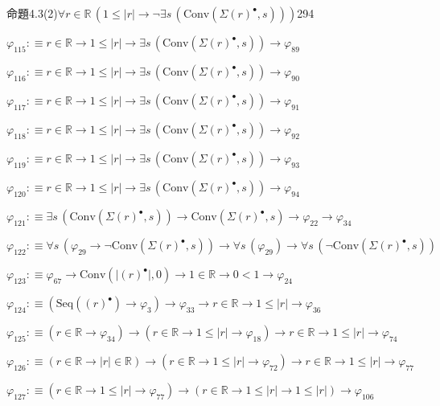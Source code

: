 \begin{fullproof}{命題4.3(2)}{$\forall r \in \mathbb{R}\,(1 \leq \lvert r \rvert \to \neg \exists s\,(\mathrm{Conv}(\Sigma {(r)^{\bullet}},s)))$}{294}
\begin{abbrevlist}
\item $\varphi_{115} :\equiv r \in \mathbb{R} \to 1 \leq \lvert r \rvert \to \exists s\,(\mathrm{Conv}(\Sigma {(r)^{\bullet}},s)) \to \varphi_{89}$
\item $\varphi_{116} :\equiv r \in \mathbb{R} \to 1 \leq \lvert r \rvert \to \exists s\,(\mathrm{Conv}(\Sigma {(r)^{\bullet}},s)) \to \varphi_{90}$
\item $\varphi_{117} :\equiv r \in \mathbb{R} \to 1 \leq \lvert r \rvert \to \exists s\,(\mathrm{Conv}(\Sigma {(r)^{\bullet}},s)) \to \varphi_{91}$
\item $\varphi_{118} :\equiv r \in \mathbb{R} \to 1 \leq \lvert r \rvert \to \exists s\,(\mathrm{Conv}(\Sigma {(r)^{\bullet}},s)) \to \varphi_{92}$
\item $\varphi_{119} :\equiv r \in \mathbb{R} \to 1 \leq \lvert r \rvert \to \exists s\,(\mathrm{Conv}(\Sigma {(r)^{\bullet}},s)) \to \varphi_{93}$
\item $\varphi_{120} :\equiv r \in \mathbb{R} \to 1 \leq \lvert r \rvert \to \exists s\,(\mathrm{Conv}(\Sigma {(r)^{\bullet}},s)) \to \varphi_{94}$
\item $\varphi_{121} :\equiv \exists s\,(\mathrm{Conv}(\Sigma {(r)^{\bullet}},s)) \to \mathrm{Conv}(\Sigma {(r)^{\bullet}},s) \to \varphi_{22} \to \varphi_{34}$
\item $\varphi_{122} :\equiv \forall s\,(\varphi_{29} \to \neg \mathrm{Conv}(\Sigma {(r)^{\bullet}},s)) \to \forall s\,(\varphi_{29}) \to \forall s\,(\neg \mathrm{Conv}(\Sigma {(r)^{\bullet}},s))$
\item $\varphi_{123} :\equiv \varphi_{67} \to \mathrm{Conv}(\lvert {(r)^{\bullet}} \rvert,0) \to 1 \in \mathbb{R} \to 0 < 1 \to \varphi_{24}$
\item $\varphi_{124} :\equiv (\mathrm{Seq}({(r)^{\bullet}}) \to \varphi_{3}) \to \varphi_{33} \to r \in \mathbb{R} \to 1 \leq \lvert r \rvert \to \varphi_{36}$
\item $\varphi_{125} :\equiv (r \in \mathbb{R} \to \varphi_{34}) \to (r \in \mathbb{R} \to 1 \leq \lvert r \rvert \to \varphi_{18}) \to r \in \mathbb{R} \to 1 \leq \lvert r \rvert \to \varphi_{74}$
\item $\varphi_{126} :\equiv (r \in \mathbb{R} \to \lvert r \rvert \in \mathbb{R}) \to (r \in \mathbb{R} \to 1 \leq \lvert r \rvert \to \varphi_{72}) \to r \in \mathbb{R} \to 1 \leq \lvert r \rvert \to \varphi_{77}$
\item $\varphi_{127} :\equiv (r \in \mathbb{R} \to 1 \leq \lvert r \rvert \to \varphi_{77}) \to (r \in \mathbb{R} \to 1 \leq \lvert r \rvert \to 1 \leq \lvert r \rvert) \to \varphi_{106}$

\end{abbrevlist}
\end{fullproof}
